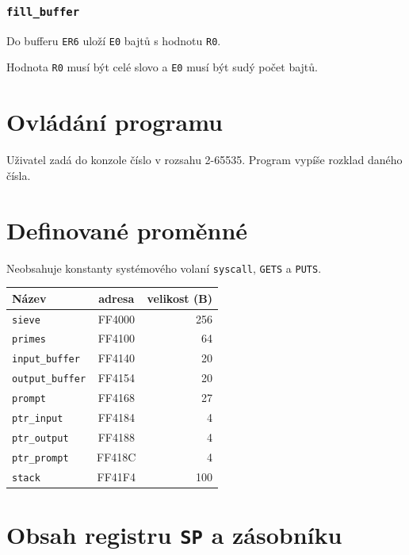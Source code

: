 \documentclass[12pt]{article}
\newcommand{\code}[1]{\mbox{\texttt{#1}}}
\begin{document}
\subsubsection{\code{fill\_buffer}}

Do bufferu \code{ER6} uloží \code{E0} bajtů s hodnotu \code{R0}.

Hodnota \code{R0} musí být celé slovo a \code{E0} musí být sudý počet bajtů.

\section{Ovládání programu}

Uživatel zadá do konzole číslo v rozsahu 2-65535. Program vypíše rozklad daného
čísla.

\section{Definované proměnné}

Neobsahuje konstanty systémového volaní \code{syscall}, \code{GETS} a
\code{PUTS}.

\begin{table}[H]
	\centering
	\begin{tabular}{|l|c|r|}
		\hline
		Název                 & adresa & velikost (B) \\ \hline
		\code{sieve}          & FF4000 & 256          \\ \hline
		\code{primes}         & FF4100 & 64           \\ \hline
		\code{input\_buffer}  & FF4140 & 20           \\ \hline
		\code{output\_buffer} & FF4154 & 20           \\ \hline
		\code{prompt}         & FF4168 & 27           \\ \hline
		\code{ptr\_input}     & FF4184 & 4            \\ \hline
		\code{ptr\_output}    & FF4188 & 4            \\ \hline
		\code{ptr\_prompt}    & FF418C & 4            \\ \hline
		\code{stack}          & FF41F4 & 100          \\ \hline
	\end{tabular}
\end{table}

\section{Obsah registru \code{SP} a zásobníku}
\end{document}
